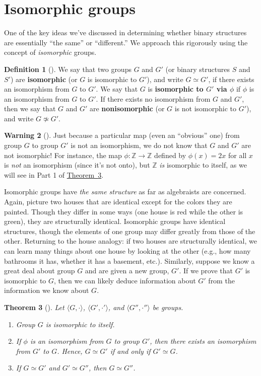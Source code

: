 \documentclass[10pt,]{book}
\newcommand{\terminology}[1]{\textbf{#1}}
\theoremstyle{plain}
\newtheorem{theorem}{Theorem}[section]
\theoremstyle{definition}
\newtheorem{definition}[theorem]{Definition}
\theoremstyle{definition}
\newtheorem{warning}[theorem]{Warning}
\theoremstyle{definition}
\theoremstyle{definition}
\numberwithin{equation}{section}
\def\Z{\mathbb{Z}}
\begin{document}
\section[{Isomorphic groups}]{Isomorphic groups}\label{isomorphicgps}
One of the key ideas we've discussed in determining whether binary structures are essentially ``the same'' or ``different.'' We approach this rigorously using the concept of \emph{isomorphic} groups.%
\begin{definition}[{}]\label{definition-34}
\label{notation-50}
\label{notation-51}
We say that two groups \(G\) and \(G'\) (or binary structures \(S\) and \(S'\)) are \terminology{isomorphic} (or \(G\) is isomorphic to \(G'\)), and write \(G\simeq G'\), if there exists an isomorphism from \(G\) to \(G'\). We say that \(G\) is \terminology{isomorphic to \(G'\) via \(\phi\)} if \(\phi\) is an isomorphism from \(G\) to \(G'\). If there exists no isomorphism from \(G\) and \(G'\), then we say that \(G\) and \(G'\) are \terminology{nonisomorphic} (or \(G\) is not isomorphic to \(G'\)), and write \(G\not\simeq G'\).%
\end{definition}
\begin{warning}[]\label{warning-12}
Just because a particular map (even an ``obvious'' one) from group \(G\) to group \(G'\) is not an isomorphism, we do not know that \(G\) and \(G'\) are not isomorphic! For instance, the map \(\phi: \Z\to \Z\) defined by \(\phi(x)=2x\) for all \(x\) is \emph{not} an isomorphism (since it's not onto), but \(\Z\) \emph{is} isomorphic to itself, as we will see in Part 1 of \hyperref[groupisoequiv]{Theorem~\ref{groupisoequiv}}.%
\end{warning}
Isomorphic groups have \emph{the same structure} as far as algebraists are concerned. Again, picture two houses that are identical except for the colors they are painted. Though they differ in some ways (one house is red while the other is green), they are structurally identical. Isomorphic groups have identical structures, though the elements of one group may differ greatly from those of the other. Returning to the house analogy: if two houses are structurally identical, we can learn many things about one house by looking at the other (e.g., how many bathrooms it has, whether it has a basement, etc.). Similarly, suppose we know a great deal about group \(G\) and are given a new group, \(G'\). If we prove that \(G'\) is isomorphic to \(G\), then we can likely deduce information about \(G'\) from the information we know about \(G\).%
\begin{theorem}[{}]\label{groupisoequiv}
Let \(\langle G,\cdot\rangle\), \(\langle G',\cdot'\rangle\), and \(\langle G'',\cdot''\rangle\) be groups. \leavevmode%
\begin{enumerate}
\item\hypertarget{li-145}{}Group \(G\) is isomorphic to itself.%
\item\hypertarget{li-146}{}If \(\phi\) is an isomorphism from \(G\) to group \(G'\), then there exists an isomorphism from \(G'\) to \(G\). Hence, \(G\simeq G'\) if and only if \(G'\simeq G\).%
\item\hypertarget{li-147}{}If \(G\simeq G'\) and \(G'\simeq G''\), then \(G\simeq G''\).%
\end{enumerate}
%
\end{theorem}
\end{document}
